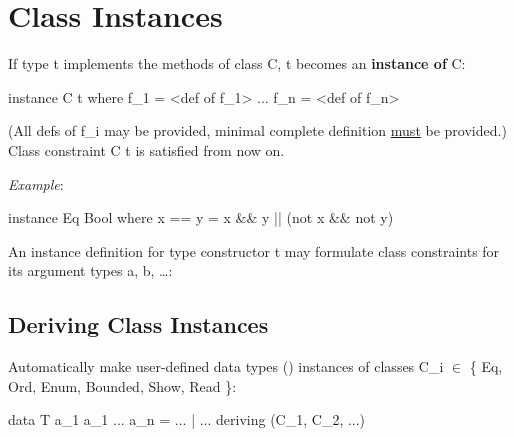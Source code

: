 \section{Class Instances}

If type t implements the methods of class C, t becomes an \textbf{instance of} C:
\begin{codebox}[haskell]
instance C t where
    f_1 = <def of f_1>
    ...
    f_n = <def of f_n>
\end{codebox}
(All defs of f\_i may be provided, minimal complete definition \underline{must} be provided.)
Class constraint C t is satisfied from now on.

\textit{Example}:

\begin{codebox}[haskell]
instance Eq Bool where
    x == y = x && y || (not x && not y)
\end{codebox}

An instance definition for type constructor t may formulate class constraints for its argument types a, b, \dots:\\




\subsection{Deriving Class Instances}

Automatically make user-defined data types () instances of classes C\_i $\in$ \{ Eq, Ord, Enum, Bounded, Show, Read \}:

\begin{codebox}[haskell]
data T a_1 a_1 ... a_n = ...
                       | ...
    deriving (C_1, C_2, ...)
\end{codebox}





